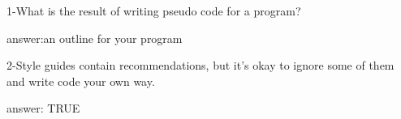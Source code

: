 1-What is the result of writing pseudo code for a program?

answer:an outline for your program

2-Style guides contain recommendations, but it's okay to ignore some of them and write code your own way.

answer: TRUE
